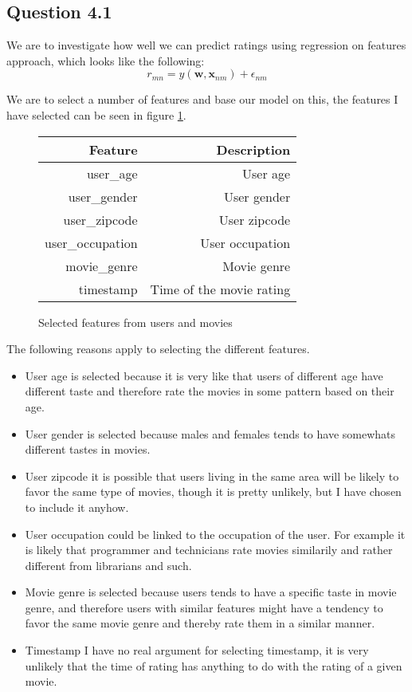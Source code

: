 \subsection*{Question 4.1}

We are to investigate how well we can predict ratings using regression
on features approach, which looks like the following:
\begin{equation*}
r_{mn} = y(\mathbf{w}, \mathbf{x}_{nm}) + \epsilon_{nm}
\end{equation*}

We are to select a number of features and base our model on this, the features I have selected can be seen in figure \ref{fig:q41features}.

\begin{figure}[!htbp]
\centering
\begin{tabular}{r|r}
Feature & Description \\
\hline
user\_age & User age \\
user\_gender & User gender \\
user\_zipcode & User zipcode \\
user\_occupation & User occupation \\
movie\_genre & Movie genre \\
timestamp & Time of the movie rating
\end{tabular}
\caption{Selected features from users and movies}
\label{fig:q41features}
\end{figure}

The following reasons apply to selecting the different features.
\begin{itemize}
\item User age is selected because it is very like that users of
  different age have different taste and therefore rate the movies in
  some pattern based on their age.
\item User gender is selected because males and females tends to have
  somewhats different tastes in movies.
\item User zipcode it is possible that users living in the same area
  will be likely to favor the same type of movies, though it is pretty
  unlikely, but I have chosen to include it anyhow.
\item User occupation could be linked to the occupation of the
  user. For example it is likely that programmer and technicians rate
  movies similarily and rather different from librarians and such.
\item Movie genre is selected because users tends to have a specific
  taste in movie genre, and therefore users with similar features
  might have a tendency to favor the same movie genre and thereby rate
  them in a similar manner.
\item Timestamp I have no real argument for selecting timestamp, it is
  very unlikely that the time of rating has anything to do with the
  rating of a given movie.
\end{itemize}

